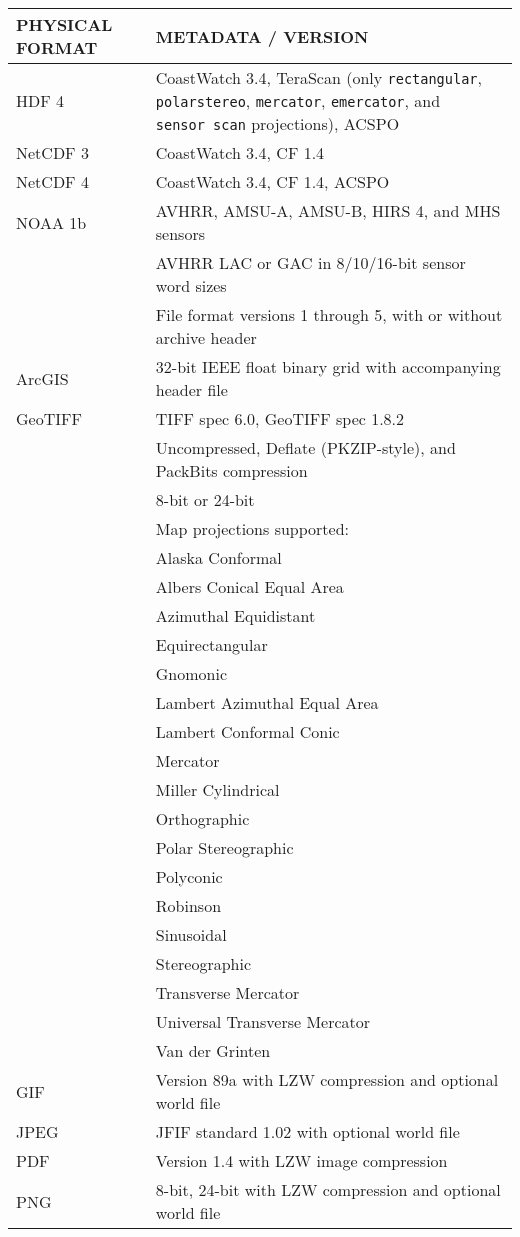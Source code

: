 \begin{tabular}{|l|p{10cm}|}
  \hline 

  PHYSICAL FORMAT & METADATA / VERSION \\ \hline

  HDF 4 & CoastWatch 3.4, TeraScan (only {\tt rectangular}, {\tt polarstereo},
  {\tt mercator}, {\tt emercator}, and {\tt sensor\ scan} projections), ACSPO \\ \hline

  NetCDF 3 & CoastWatch 3.4, CF 1.4 \\ \hline

  NetCDF 4 & CoastWatch 3.4, CF 1.4, ACSPO \\ \hline

  NOAA 1b & AVHRR, AMSU-A, AMSU-B, HIRS 4, and MHS sensors \\
  & AVHRR LAC or GAC in 8/10/16-bit sensor word sizes \\
  & File format versions 1 through 5, with or without archive header \\ \hline

  ArcGIS & 32-bit IEEE float binary grid with accompanying header
  file \\ \hline

  GeoTIFF & TIFF spec 6.0, GeoTIFF spec 1.8.2 \\
  & Uncompressed, Deflate (PKZIP-style), and PackBits compression \\
  & 8-bit or 24-bit \\
  & Map projections supported: \\
  & Alaska Conformal \\
  & Albers Conical Equal Area \\
  & Azimuthal Equidistant \\
  & Equirectangular \\
  & Gnomonic \\
  & Lambert Azimuthal Equal Area \\
  & Lambert Conformal Conic \\
  & Mercator \\
  & Miller Cylindrical \\
  & Orthographic \\
  & Polar Stereographic \\
  & Polyconic \\
  & Robinson \\
  & Sinusoidal \\
  & Stereographic \\
  & Transverse Mercator \\
  & Universal Transverse Mercator \\
  & Van der Grinten \\ \hline

  GIF & Version 89a with LZW compression and optional world file \\ \hline

  JPEG & JFIF standard 1.02 with optional world file \\ \hline

  PDF & Version 1.4 with LZW image compression \\ \hline

  PNG & 8-bit, 24-bit with LZW compression and optional world file \\ \hline

\end{tabular}
